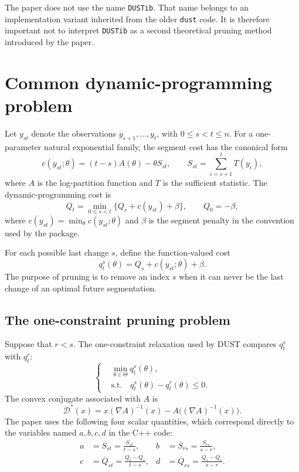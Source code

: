 \documentclass[11pt]{article}
\newcommand{\Dstar}{\mathcal{D}^*}
\begin{document}
The paper does not use the name \texttt{DUSTib}.  That name belongs to an
implementation variant inherited from the older \texttt{dust} code.  It is
therefore important not to interpret \texttt{DUSTib} as a second theoretical
pruning method introduced by the paper.

\section{Common dynamic-programming problem}

Let $y_{st}$ denote the observations $y_{s+1},\ldots,y_t$, with
$0\leq s<t\leq n$.  For a one-parameter natural exponential family, the
segment cost has the canonical form
\begin{equation}
  c(y_{st};\theta)=(t-s)A(\theta)-\theta S_{st},
  \qquad S_{st}=\sum_{i=s+1}^t T(y_i),
  \label{eq:canonical-cost}
\end{equation}
where $A$ is the log-partition function and $T$ is the sufficient statistic.
The dynamic-programming cost is
\begin{equation}
  Q_t=\min_{0\leq s<t}\{Q_s+c(y_{st})+\beta\},
  \qquad Q_0=-\beta,
  \label{eq:op}
\end{equation}
where $c(y_{st})=\min_\theta c(y_{st};\theta)$ and $\beta$ is the segment
penalty in the convention used by the package.

For each possible last change $s$, define the function-valued cost
\begin{equation}
  q_t^s(\theta)=Q_s+c(y_{st};\theta)+\beta.
  \label{eq:functional-cost}
\end{equation}
The purpose of pruning is to remove an index $s$ when it can never be the
last change of an optimal future segmentation.

\subsection{The one-constraint pruning problem}

Suppose that $r<s$.  The one-constraint relaxation used by DUST compares
$q_t^s$ with $q_t^r$:
\begin{equation}
\left\{
\begin{aligned}
  &\min_{\theta\in\Theta}q_t^s(\theta),\\
  &\text{s.t.}\quad q_t^s(\theta)-q_t^r(\theta)\leq 0.
\end{aligned}
\right.
\label{eq:pruning-problem}
\end{equation}
The convex conjugate associated with $A$ is
\begin{equation}
  \Dstar(x)=x(\nabla A)^{-1}(x)-A\bigl((\nabla A)^{-1}(x)\bigr).
  \label{eq:conjugate}
\end{equation}
The paper uses the following four scalar quantities, which correspond
directly to the variables named $a,b,c,d$ in the C++ code:
\begin{align}
  a&=\overline S_{st}=\frac{S_{st}}{t-s},
  &b&=\overline S_{rs}=\frac{S_{rs}}{s-r},
  \label{eq:ab}\\
  c&=\overline Q_{st}=\frac{Q_t-Q_s}{t-s},
  &d&=\overline Q_{rs}=\frac{Q_s-Q_r}{s-r}.
  \label{eq:cd}
\end{align}
\end{document}
